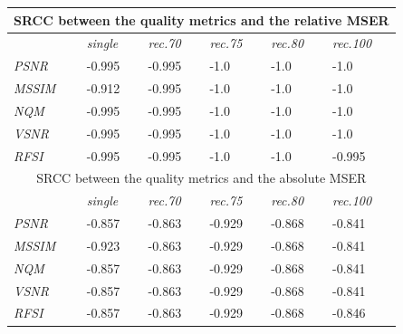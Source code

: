 \documentclass[10pt,twocolumn,letterpaper]{article}
\begin{document}
\begin{table}\footnotesize\centering
\begin{tabular}{ | l || l | l | l | l | l | }
    \hline
    \multicolumn{6}{|c|}{SRCC between the quality metrics and the relative MSER} \\
    \hline
    & \emph{single} & \emph{rec.70} & \emph{rec.75} & \emph{rec.80} & \emph{rec.100} \\ \hline
    \emph{PSNR} & -0.995 \cellcolor[rgb]{0,0.5,0} & -0.995 \cellcolor[rgb]{0,0.5,0} & -1.0 \cellcolor[rgb]{0,0.5,0} & -1.0 \cellcolor[rgb]{0,0.5,0} & -1.0 \cellcolor[rgb]{0,0.5,0} \\ \hline
    \emph{MSSIM} & -0.912 \cellcolor[rgb]{0,0.5,0} & -0.995 \cellcolor[rgb]{0,0.5,0} & -1.0 \cellcolor[rgb]{0,0.5,0} & -1.0 \cellcolor[rgb]{0,0.5,0} & -1.0 \cellcolor[rgb]{0,0.5,0} \\ \hline
    \emph{NQM} & -0.995 \cellcolor[rgb]{0,0.5,0} & -0.995 \cellcolor[rgb]{0,0.5,0} & -1.0 \cellcolor[rgb]{0,0.5,0} & -1.0 \cellcolor[rgb]{0,0.5,0} & -1.0 \cellcolor[rgb]{0,0.5,0} \\ \hline
    \emph{VSNR} & -0.995 \cellcolor[rgb]{0,0.5,0} & -0.995 \cellcolor[rgb]{0,0.5,0} & -1.0 \cellcolor[rgb]{0,0.5,0} & -1.0 \cellcolor[rgb]{0,0.5,0} & -1.0 \cellcolor[rgb]{0,0.5,0} \\ \hline
    \emph{RFSI} & -0.995 \cellcolor[rgb]{0,0.5,0} & -0.995 \cellcolor[rgb]{0,0.5,0} & -1.0 \cellcolor[rgb]{0,0.5,0} & -1.0 \cellcolor[rgb]{0,0.5,0} & -0.995 \cellcolor[rgb]{0,0.5,0} \\ \hline
    \hline
    
    \multicolumn{6}{|c|}{SRCC between the quality metrics and the absolute MSER} \\
    \hline
    & \emph{single} & \emph{rec.70} & \emph{rec.75} & \emph{rec.80} & \emph{rec.100} \\ \hline
    \emph{PSNR} & -0.857 \cellcolor[rgb]{0,0.5,0} & -0.863 \cellcolor[rgb]{0,0.5,0} & -0.929 \cellcolor[rgb]{0,0.5,0} & -0.868 \cellcolor[rgb]{0,0.5,0} & -0.841 \cellcolor[rgb]{0,0.5,0} \\ \hline
    \emph{MSSIM} & -0.923 \cellcolor[rgb]{0,0.5,0} & -0.863 \cellcolor[rgb]{0,0.5,0} & -0.929 \cellcolor[rgb]{0,0.5,0} & -0.868 \cellcolor[rgb]{0,0.5,0} & -0.841 \cellcolor[rgb]{0,0.5,0} \\ \hline
    \emph{NQM} & -0.857 \cellcolor[rgb]{0,0.5,0} & -0.863 \cellcolor[rgb]{0,0.5,0} & -0.929 \cellcolor[rgb]{0,0.5,0} & -0.868 \cellcolor[rgb]{0,0.5,0} & -0.841 \cellcolor[rgb]{0,0.5,0} \\ \hline
    \emph{VSNR} & -0.857 \cellcolor[rgb]{0,0.5,0} & -0.863 \cellcolor[rgb]{0,0.5,0} & -0.929 \cellcolor[rgb]{0,0.5,0} & -0.868 \cellcolor[rgb]{0,0.5,0} & -0.841 \cellcolor[rgb]{0,0.5,0} \\ \hline
    \emph{RFSI} & -0.857 \cellcolor[rgb]{0,0.5,0} & -0.863 \cellcolor[rgb]{0,0.5,0} & -0.929 \cellcolor[rgb]{0,0.5,0} & -0.868 \cellcolor[rgb]{0,0.5,0} & -0.846 \cellcolor[rgb]{0,0.5,0} \\ \hline


\end{tabular}
\end{table}
\end{document}
